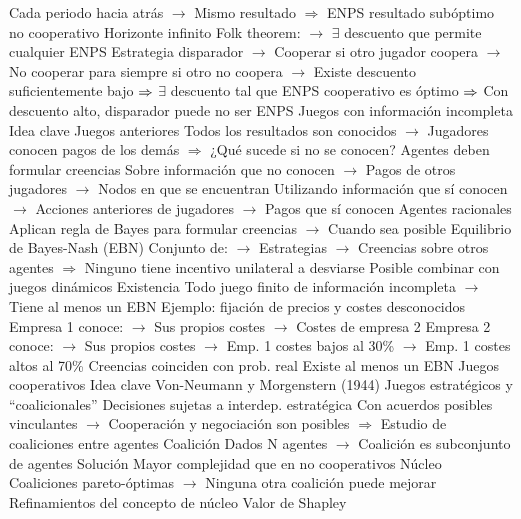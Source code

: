 \documentclass{nuevotema}
\begin{document}
\begin{esquemal}
				\4[] Cada periodo hacia atrás
				\4[] $\to$ Mismo resultado
				\4[] $\Rightarrow$ ENPS resultado subóptimo no cooperativo
				\4 Horizonte infinito
				\4[] Folk theorem:
				\4[] $\to$ $\exists$ descuento que permite cualquier ENPS
				\4[] Estrategia disparador
				\4[] $\to$ Cooperar si otro jugador coopera
				\4[] $\to$ No cooperar para siempre si otro no coopera
				\4[] $\to$ Existe descuento suficientemente bajo
				\4[] $\Rightarrow$ $\exists$ descuento tal que ENPS cooperativo es óptimo
				\4[] $\Rightarrow$ Con descuento alto, disparador puede no ser ENPS
		\2 Juegos con información incompleta
			\3 Idea clave
				\4 Juegos anteriores
				\4[] Todos los resultados son conocidos
				\4[] $\to$ Jugadores conocen pagos de los demás
				\4[] $\Rightarrow$ ¿Qué sucede si no se conocen?
				\4 Agentes deben formular creencias
				\4[] Sobre información que no conocen
				\4[] $\to$ Pagos de otros jugadores
				\4[] $\to$ Nodos en que se encuentran
				\4[] Utilizando información que sí conocen
				\4[] $\to$ Acciones anteriores de jugadores
				\4[] $\to$ Pagos que sí conocen
				\4 Agentes racionales
				\4[] Aplican regla de Bayes para formular creencias
				\4[] $\to$ Cuando sea posible
			\3 Equilibrio de Bayes-Nash (EBN)
				\4[] Conjunto de:
				\4[] $\to$ Estrategias
				\4[] $\to$ Creencias sobre otros agentes
				\4[] $\Rightarrow$ Ninguno tiene incentivo unilateral a desviarse
				\4 Posible combinar con juegos dinámicos
				\4 Existencia
				\4[] Todo juego finito de información incompleta
				\4[] $\to$ Tiene al menos un EBN
			\3 Ejemplo: fijación de precios y costes desconocidos
				\4 Empresa 1 conoce:
				\4[] $\to$ Sus propios costes
				\4[] $\to$ Costes de empresa 2
				\4 Empresa 2 conoce:
				\4[] $\to$ Sus propios costes
				\4[] $\to$ Emp. 1 costes bajos al 30\%
				\4[] $\to$ Emp. 1 costes altos al 70\%
				\4 Creencias coinciden con prob. real
				\4[$\Rightarrow$] Existe al menos un EBN
		\2 Juegos cooperativos
			\3 Idea clave
				\4 Von-Neumann y Morgenstern (1944)
				\4[] Juegos estratégicos y ``coalicionales''
				\4 Decisiones sujetas a interdep. estratégica
				\4[] Con acuerdos posibles vinculantes
				\4[] $\to$ Cooperación y negociación son posibles
				\4[] $\Rightarrow$ Estudio de coaliciones entre agentes
				\4 Coalición
				\4[] Dados N agentes
				\4[] $\to$ Coalición es subconjunto de agentes
			\3 Solución
				\4 Mayor complejidad que en no cooperativos
				\4 Núcleo
				\4[] Coaliciones pareto-óptimas
				\4[] $\to$ Ninguna otra coalición puede mejorar
				\4 Refinamientos del concepto de núcleo
			\3 Valor de Shapley

\end{esquemal}
\end{document}
